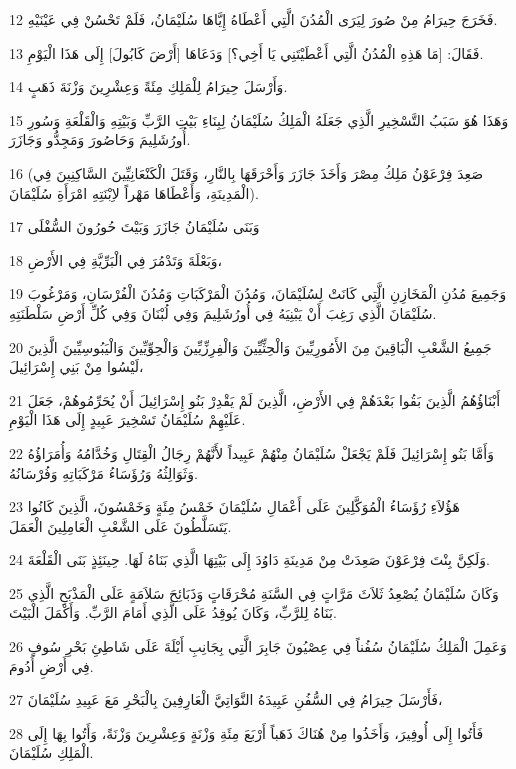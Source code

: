 \par 12 فَخَرَجَ حِيرَامُ مِنْ صُورَ لِيَرَى الْمُدُنَ الَّتِي أَعْطَاهُ إِيَّاهَا سُلَيْمَانُ، فَلَمْ تَحْسُنْ فِي عَيْنَيْهِ.
\par 13 فَقَالَ: [مَا هَذِهِ الْمُدُنُ الَّتِي أَعْطَيْتَنِي يَا أَخِي؟] وَدَعَاهَا [أَرْضَ كَابُولَ] إِلَى هَذَا الْيَوْمِ.
\par 14 وَأَرْسَلَ حِيرَامُ لِلْمَلِكِ مِئَةً وَعِشْرِينَ وَزْنَةَ ذَهَبٍ.
\par 15 وَهَذَا هُوَ سَبَبُ التَّسْخِيرِ الَّذِي جَعَلَهُ الْمَلِكُ سُلَيْمَانُ لِبِنَاءِ بَيْتِ الرَّبِّ وَبَيْتِهِ وَالْقَلْعَةِ وَسُورِ أُورُشَلِيمَ وَحَاصُورَ وَمَجِدُّو وَجَازَرَ.
\par 16 (صَعِدَ فِرْعَوْنُ مَلِكُ مِصْرَ وَأَخَذَ جَازَرَ وَأَحْرَقَهَا بِالنَّارِ، وَقَتَلَ الْكَنْعَانِيِّينَ السَّاكِنِينَ فِي الْمَدِينَةِ، وَأَعْطَاهَا مَهْراً لاِبْنَتِهِ امْرَأَةِ سُلَيْمَانَ).
\par 17 وَبَنَى سُلَيْمَانُ جَازَرَ وَبَيْتَ حُورُونَ السُّفْلَى
\par 18 وَبَعْلَةَ وَتَدْمُرَ فِي الْبَرِّيَّةِ فِي الأَرْضِ،
\par 19 وَجَمِيعَ مُدُنِ الْمَخَازِنِ الَّتِي كَانَتْ لِسُلَيْمَانَ، وَمُدُنَ الْمَرْكَبَاتِ وَمُدُنَ الْفُرْسَانِ، وَمَرْغُوبَ سُلَيْمَانَ الَّذِي رَغِبَ أَنْ يَبْنِيَهُ فِي أُورُشَلِيمَ وَفِي لُبْنَانَ وَفِي كُلِّ أَرْضِ سَلْطَنَتِهِ.
\par 20 جَمِيعُ الشَّعْبِ الْبَاقِينَ مِنَ الأَمُورِيِّينَ وَالْحِثِّيِّينَ وَالْفِرِزِّيِّينَ وَالْحِوِّيِّينَ وَالْيَبُوسِيِّينَ الَّذِينَ لَيْسُوا مِنْ بَنِي إِسْرَائِيلَ،
\par 21 أَبْنَاؤُهُمُ الَّذِينَ بَقُوا بَعْدَهُمْ فِي الأَرْضِ، الَّذِينَ لَمْ يَقْدِرْ بَنُو إِسْرَائِيلَ أَنْ يُحَرِّمُوهُمْ، جَعَلَ عَلَيْهِمْ سُلَيْمَانُ تَسْخِيرَ عَبِيدٍ إِلَى هَذَا الْيَوْمِ.
\par 22 وَأَمَّا بَنُو إِسْرَائِيلَ فَلَمْ يَجْعَلْ سُلَيْمَانُ مِنْهُمْ عَبِيداً لأَنَّهُمْ رِجَالُ الْقِتَالِ وَخُدَّامُهُ وَأُمَرَاؤُهُ وَثَوَالِثُهُ وَرُؤَسَاءُ مَرْكَبَاتِهِ وَفُرْسَانُهُ.
\par 23 هَؤُلاَءِ رُؤَسَاءُ الْمُوَكَّلِينَ عَلَى أَعْمَالِ سُلَيْمَانَ خَمْسُ مِئَةٍ وَخَمْسُونَ، الَّذِينَ كَانُوا يَتَسَلَّطُونَ عَلَى الشَّعْبِ الْعَامِلِينَ الْعَمَلَ.
\par 24 وَلَكِنَّ بِنْتَ فِرْعَوْنَ صَعِدَتْ مِنْ مَدِينَةِ دَاوُدَ إِلَى بَيْتِهَا الَّذِي بَنَاهُ لَهَا. حِينَئِذٍ بَنَى الْقَلْعَةَ.
\par 25 وَكَانَ سُلَيْمَانُ يُصْعِدُ ثَلاَثَ مَرَّاتٍ فِي السَّنَةِ مُحْرَقَاتٍ وَذَبَائِحَ سَلاَمَةٍ عَلَى الْمَذْبَحِ الَّذِي بَنَاهُ لِلرَّبِّ، وَكَانَ يُوقِدُ عَلَى الَّذِي أَمَامَ الرَّبِّ. وَأَكْمَلَ الْبَيْتَ.
\par 26 وَعَمِلَ الْمَلِكُ سُلَيْمَانُ سُفُناً فِي عِصْيُونَ جَابِرَ الَّتِي بِجَانِبِ أَيْلَةَ عَلَى شَاطِئِ بَحْرِ سُوفٍ فِي أَرْضِ أَدُومَ.
\par 27 فَأَرْسَلَ حِيرَامُ فِي السُّفُنِ عَبِيدَهُ النَّوَاتِيَّ الْعَارِفِينَ بِالْبَحْرِ مَعَ عَبِيدِ سُلَيْمَانَ،
\par 28 فَأَتُوا إِلَى أُوفِيرَ، وَأَخَذُوا مِنْ هُنَاكَ ذَهَباً أَرْبَعَ مِئَةِ وَزْنَةٍ وَعِشْرِينَ وَزْنَةً، وَأَتُوا بِهَا إِلَى الْمَلِكِ سُلَيْمَانَ.

